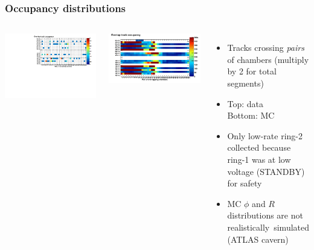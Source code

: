 \documentclass[compress]{beamer}
\begin{document}
\begin{frame}
\frametitle{Occupancy distributions}

\begin{columns}
\includegraphics[width=\linewidth]{REAL_occupancy1.pdf}

\includegraphics[width=\linewidth]{MCBeamHalo_occupancy1.pdf}

\begin{itemize}
\item Tracks crossing {\it pairs} of chambers (multiply by 2 for total segments)

\item Top: data \\ Bottom: MC

\item Only low-rate ring-2 collected because ring-1 was at low voltage {\scriptsize (STANDBY)} for safety

\item MC $\phi$ and $R$ distributions are not \mbox{realistically simulated\hspace{-1 cm}} \\ {\scriptsize (ATLAS cavern)}

\end{itemize}
\end{columns}
\end{frame}
\end{document}
